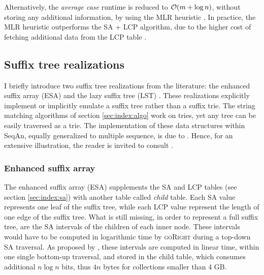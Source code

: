 Alternatively, the \emph{average case} runtime is reduced to $\mathcal{O}(m + \log{n})$, without storing any additional information, by using the MLR heuristic \citep{Manber1990}.
In practice, the MLR heuristic outperforms the SA + LCP algorithm, due to the higher cost of fetching additional data from the LCP table \citep{Weese2013}.


\subsection{Suffix tree realizations}
\label{sec:index:stree}

I briefly introduce two suffix tree realizations from the literature: the enhanced suffix array (ESA) \citep{Abouelhoda2004} and the lazy suffix tree (LST) \citep{Giegerich2003}.
These realizations explicitly implement or implicitly emulate a suffix tree rather than a suffix trie.
The string matching algorithms of section \ref{sec:index:algo} work on tries, yet any tree can be easily traversed as a trie.
The implementation of these data structures within SeqAn, equally generalized to multiple sequence, is due to \citeauthor{Weese2013}.
Hence, for an extensive illustration, the reader is invited to consult \citep{Weese2013}.

\subsubsection{Enhanced suffix array}
\label{sec:index:esa}

The enhanced suffix array (ESA) \citep{Abouelhoda2004} supplements the SA and LCP tables (see section \ref{sec:index:sa}) with another table called \emph{child} table.
Each SA value represents one leaf of the suffix tree, while each LCP value represent the length of one edge of the suffix tree.
What is still missing, in order to represent a full suffix tree, are the SA intervals of the children of each inner node.
These intervals would have to be computed in logarithmic time by \textsc{goRight} during a top-down SA traversal.
As proposed by \cite{Abouelhoda2004}, these intervals are computed in linear time, within one single bottom-up traversal, and stored in the child table, which consumes additional $n \log n$ bits, thus $4n$ bytes for collections smaller than 4 GB.

